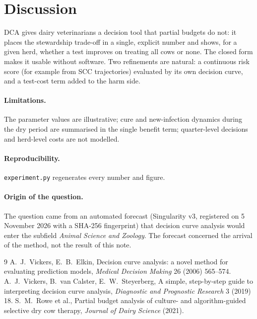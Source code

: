 \documentclass[11pt]{article}
\begin{document}
\section{Discussion}
DCA gives dairy veterinarians a decision tool that partial budgets do not: it places the stewardship trade-off in a
single, explicit number and shows, for a given herd, whether a test improves on treating all cows or none. The closed
form makes it usable without software. Two refinements are natural: a continuous risk score (for example from SCC
trajectories) evaluated by its own decision curve, and a test-cost term added to the harm side.

\paragraph{Limitations.} The parameter values are illustrative; cure and new-infection dynamics during the dry period
are summarised in the single benefit term; quarter-level decisions and herd-level costs are not modelled.

\paragraph{Reproducibility.} \texttt{experiment.py} regenerates every number and figure.

\paragraph{Origin of the question.} The question came from an automated forecast (Singularity v3, registered on 5
November 2026 with a SHA-256 fingerprint) that decision curve analysis would enter the subfield \emph{Animal Science
and Zoology}. The forecast concerned the arrival of the method, not the result of this note.

\begin{thebibliography}{9}
 A.~J.~Vickers, E.~B.~Elkin, Decision curve analysis: a novel method for evaluating prediction
models, \emph{Medical Decision Making} 26 (2006) 565--574.
 A.~J.~Vickers, B.~van Calster, E.~W.~Steyerberg, A simple, step-by-step guide to interpreting
decision curve analysis, \emph{Diagnostic and Prognostic Research} 3 (2019) 18.
 S.~M.~Rowe et al., Partial budget analysis of culture- and algorithm-guided selective dry cow
therapy, \emph{Journal of Dairy Science} (2021).
\end{thebibliography}
\end{document}
